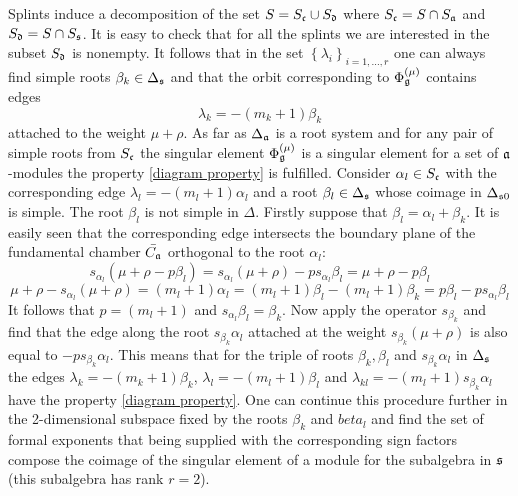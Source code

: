 \documentclass[12pt]{article}
\begin{document}
Splints induce a decomposition of the set $S=S_{\frak{c}} \cup S_{\frak{d}}$ where $S_{\frak{c}}=S \cap S_{\frak{a}}$ and $S_{\frak{d}}=S \cap S_{\frak{s}}$. It is easy to check that for all the splints we are interested in   the subset $S_{\frak{d}}$ is nonempty. It follows that in the set $\left\{ \lambda_{i}\right\}_{i=1,\dots,r}$ one can always find simple roots $\beta_k \in \Delta_{\frak{s}}$ and that the orbit corresponding to $\Phi_{\frak{g}} ^{\left( \mu \right) }$ contains edges 
\begin{equation}
 \lambda_k=-\left( m_k +1\right)\beta_k 
\label{beta edge}
\end{equation}
attached to the weight $\mu + \rho$. As far as $\Delta_{\frak{a}} $ is a root system and for any pair of simple roots from $S_{\frak{c}}$ the singular element $\Phi_{\frak{g}} ^{\left( \mu \right) }$ is a singular element for a set of $\frak{a}$-modules the property \ref{diagram property} is fulfilled. Consider $\alpha_l \in S_{\frak{c}}$ with the corresponding edge $ \lambda_l=-\left( m_l +1\right)\alpha_l $ and a root $\beta_l \in \Delta_{\frak{s}}$ whose  coimage in $\Delta_{\frak{s}0}$ is simple. The root $\beta_l $ is not simple in $\Delta$. Firstly suppose that $\beta_l =\alpha_l + \beta_k$. It is easily seen that the corresponding edge intersects the boundary plane of the fundamental chamber $\bar{C_{\frak{a}}}$ orthogonal  to the root  $\alpha_l$:
\begin{equation}
s_{\alpha_l}\left( \mu + \rho - p\beta_l\right)=s_{\alpha_l}\left( \mu + \rho \right) - p s_{\alpha_l}\beta_l=\mu + \rho - p\beta_l
\label{intersection}
\end{equation}
\begin{equation}
\mu + \rho - s_{\alpha_l}\left( \mu + \rho \right)=\left( m_l +1\right)\alpha_l =\left( m_l +1\right)\beta_l - \left( m_l +1\right)\beta_k=p\beta_l  - ps_{\alpha_l}\beta_l
\label{intersection}
\end{equation}
It follows that $p=\left( m_l +1\right)$ and $s_{\alpha_l}\beta_l=\beta_k$. Now apply the operator $s_{\beta_k}$ and find that the edge along the root $s_{\beta_k}\alpha_l$ attached at the weight $s_{\beta_k}(\mu + \rho)$ is also equal to $ -p s_{\beta_k}\alpha_l$. This means that for the triple of roots $\beta_k,\beta_l$ and $s_{\beta_k}\alpha_l$ in $\Delta_{\frak{s}}$ the edges $\lambda_k=-\left( m_k +1\right)\beta_k  $, $\lambda_l=-\left( m_l +1\right)\beta_l$ and $\lambda_{kl}=-\left( m_l +1\right)s_{\beta_k}\alpha_l$ have the property \ref{diagram property}. One can continue this procedure further in the 2-dimensional subspace    fixed by the roots $\beta_k$ and $beta_l$ and find the set of formal exponents that being supplied with the corresponding sign factors compose the coimage of the singular element of a module for the subalgebra in $\frak{s}$ (this subalgebra has rank $r=2$).    
\end{document}
